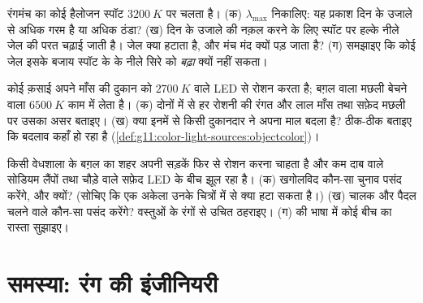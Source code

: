 \begin{exercise}[$\star\star\star$]\label{exo:g11:color-light-sources:13}
रंगमंच का कोई हैलोजन स्पॉट $\qty{3200}{K}$ पर चलता है। (क) $\lambda_{\max}$ निकालिए: यह
प्रकाश दिन के उजाले से अधिक गरम है या अधिक ठंडा? (ख) दिन के उजाले की
नक़ल करने के लिए स्पॉट पर हल्के नीले जेल की परत चढ़ाई जाती है। जेल क्या
हटाता है, और मंच मंद क्यों पड़ जाता है? (ग) समझाइए कि कोई जेल इसके बजाय
स्पॉट के  के नीले सिरे को \emph{बढ़ा} क्यों नहीं सकता।
\end{exercise}

\begin{exercise}[$\star\star\star$]\label{exo:g11:color-light-sources:14}
कोई क़साई अपने माँस की दुकान को $\qty{2700}{K}$  वाले LED से
रोशन करता है; बग़ल वाला मछली बेचने वाला $\qty{6500}{K}$ काम में लेता है। (क) दोनों में से हर
रोशनी की रंगत और लाल माँस तथा सफ़ेद मछली पर उसका असर बताइए। (ख) क्या
इनमें से किसी दुकानदार ने अपना माल बदला है? ठीक-ठीक बताइए कि बदलाव कहाँ
हो रहा है (\cref{def:g11:color-light-sources:objectcolor})।
\end{exercise}

\begin{exercise}[$\star\star\star$]\label{exo:g11:color-light-sources:15}
किसी वेधशाला के बग़ल का शहर अपनी सड़कें फिर से रोशन करना चाहता है और
कम दाब वाले सोडियम लैंपों तथा चौड़े  वाले सफ़ेद
LED के बीच झूल रहा है। (क) खगोलविद कौन-सा चुनाव पसंद करेंगे, और क्यों?
(सोचिए कि एक अकेला  उनके चित्रों में से क्या हटा सकता
है।) (ख) चालक और पैदल चलने वाले कौन-सा पसंद करेंगे? वस्तुओं के रंगों से
उचित ठहराइए। (ग)  की भाषा में कोई बीच का रास्ता सुझाइए।
\end{exercise}

\section{समस्या: रंग की इंजीनियरी}

